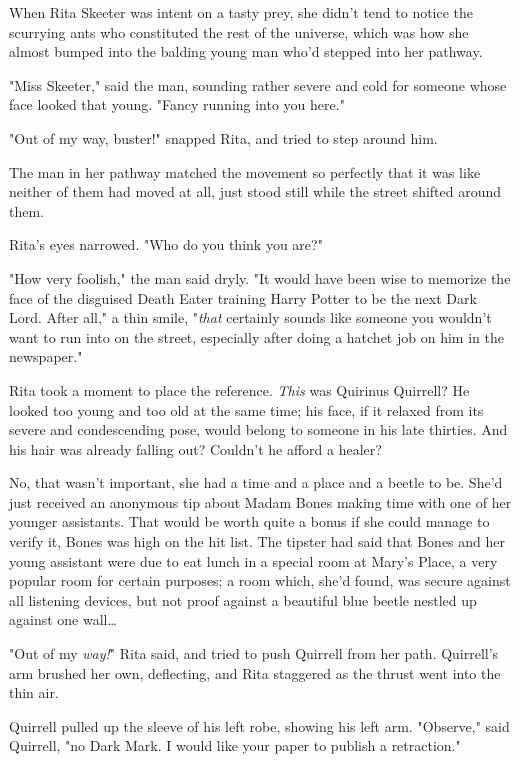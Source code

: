 When Rita Skeeter was intent on a tasty prey, she didn't tend to notice the 
scurrying ants who constituted the rest of the universe, which was how she 
almost bumped into the balding young man who'd stepped into her pathway.

"Miss Skeeter," said the man, sounding rather severe and cold for someone whose 
face looked that young. "Fancy running into you here."

"Out of my way, buster!" snapped Rita, and tried to step around him.

The man in her pathway matched the movement so perfectly that it was like 
neither of them had moved at all, just stood still while the street shifted 
around them.

Rita's eyes narrowed. "Who do you think you are?"

"How very foolish," the man said dryly. "It would have been wise to memorize 
the face of the disguised Death Eater training Harry Potter to be the next Dark 
Lord. After all," a thin smile, "\emph{that} certainly sounds like someone you 
wouldn't want to run into on the street, especially after doing a hatchet job 
on him in the newspaper."

Rita took a moment to place the reference. \emph{This} was Quirinus Quirrell? 
He looked too young and too old at the same time; his face, if it relaxed from 
its severe and condescending pose, would belong to someone in his late 
thirties. And his hair was already falling out? Couldn't he afford a healer?

No, that wasn't important, she had a time and a place and a beetle to be. She'd 
just received an anonymous tip about Madam Bones making time with one of her 
younger assistants. That would be worth quite a bonus if she could manage to 
verify it, Bones was high on the hit list. The tipster had said that Bones and 
her young assistant were due to eat lunch in a special room at Mary's Place, a 
very popular room for certain purposes; a room which, she'd found, was secure 
against all listening devices, but not proof against a beautiful blue beetle 
nestled up against one wall{\ldots}

"Out of my \emph{way!}" Rita said, and tried to push Quirrell from her path. 
Quirrell's arm brushed her own, deflecting, and Rita staggered as the thrust 
went into the thin air.

Quirrell pulled up the sleeve of his left robe, showing his left arm. 
"Observe," said Quirrell, "no Dark Mark. I would like your paper to publish a 
retraction."


